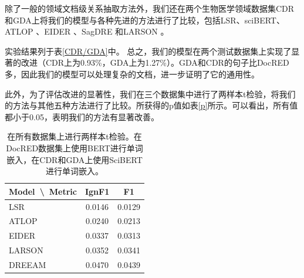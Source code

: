 \documentclass[bachelor]{thesis-uestc}
\begin{document}
除了一般的领域文档级关系抽取方法外，我们还在两个生物医学领域数据集CDR和GDA上将我们的模型与各种先进的方法进行了比较，包括LSR\cite{nan-etal-2020-reasoning}、sciBERT\cite{zhou2021document}、ATLOP \cite{zhou2021document}、EIDER \cite{xie2022eider}、SagDRE \cite{SagDRE}和LARSON \cite{duan-etal-2022-just}。\par
实验结果列于表\ref{CDR/GDA}中。
总之，我们的模型在两个测试数据集上实现了显著的改进（CDR上为0.93\%，GDA上为1.27\%）。GDA和CDR的句子比DocRED多，因此我们的模型可以处理复杂的文档，进一步证明了它的通用性。 \par
此外，为了评估改进的显著性，我们在三个数据集中进行了两样本t检验，将我们的方法与其他五种方法进行了比较。所获得的p值如表\ref{p}所示。可以看出，所有值都小于0.05，表明我们的方法有显著改善。

\begin{table}[]
    \begin{tabular}{lcc}
    \hline
    Model\ \textbackslash \ Metric       & IgnF1            & F1            \\ \hline
    LSR\cite{nan-etal-2020-reasoning}       & 0.0146           & 0.0129           \\
    ATLOP\cite{zhou2021document}  & 0.0240           & 0.0213           \\
    EIDER\cite{xie2022eider}  & 0.0337          & 0.0313          \\
    LARSON\cite{duan-etal-2022-just} & 0.0352          & 0.0341              \\ 
    DREEAM\cite{ma-etal-2023-DREEAM} & 0.0470          & 0.0439              \\ \hline
    \end{tabular}
    \caption{在所有数据集上进行两样本t检验。在DocRED数据集上使用BERT进行单词嵌入，在CDR和GDA上使用SciBERT进行单词嵌入。}
    \end{table} \label{p}
\end{document}
